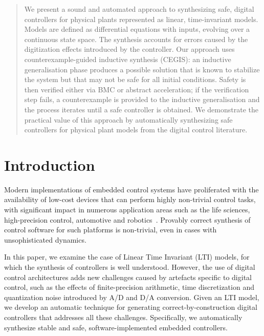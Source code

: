 \documentclass[twocolumn]{autart}    %
\begin{document}
\begin{frontmatter}
\begin{abstract}                          %
We present a sound and automated approach to synthesizing safe,
digital controllers for physical plants represented as linear,
time-invariant models. Models are defined as differential equations
with inputs, evolving over a continuous state space. The synthesis
accounts for errors caused by the digitization effects introduced by
the controller. Our approach uses counterexample-guided inductive
synthesis (CEGIS): an inductive generalisation phase produces a
possible solution that is known to stabilize the system but that may
not be safe for all initial conditions. Safety is then verified either
via BMC or abstract acceleration; if the verification step fails, a
counterexample is provided to the inductive generalisation and the
process iterates until a safe controller is obtained.  We demonstrate
the practical value of this approach by automatically synthesizing
safe controllers for physical plant models from the digital control
literature.
\end{abstract}

\end{frontmatter}

\section{Introduction}

Modern implementations of embedded control systems have proliferated
with the availability of low-cost devices that can perform highly
non-trivial control tasks, with significant impact in numerous
application areas such as the life sciences, high-precision control, 
automotive and robotics~\cite{astrom1997computer, Franklin15}.  
Provably correct synthesis of control software for such platforms is non-trivial, 
even in cases with unsophisticated dynamics. 

In this paper, we examine the case of Linear Time Invariant (LTI)
models, for which the synthesis of controllers is well understood.
However, the use of digital control architectures adds new challenges
caused by artefacts specific to digital control, such as the effects
of finite-precision arithmetic, time discretization and quantization
noise introduced by A/D and D/A conversion.
%
Given an LTI model, we develop an automatic technique for generating
correct-by-construction digital controllers that addresses all these
challenges. Specifically, we automatically synthesize stable and safe,
software-implemented embedded controllers.  
\end{document}
